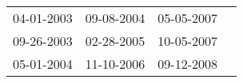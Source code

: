 \begin{supertabular}{llll}
 04-01-2003 &  09-08-2004 &  05-05-2007 \\
 09-26-2003 &  02-28-2005 &  10-05-2007 \\
 05-01-2004 &  11-10-2006 &  09-12-2008 \\
\end{supertabular}
